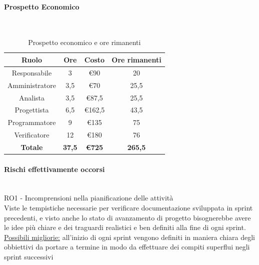 \documentclass{article}
\begin{document}
                \paragraph{Prospetto Economico}\mbox{}\\
                \begin{table}[H]
                    \centering
                    \begin{tabular}{|c|c|c|c|}
                    \hline
                    \textbf{Ruolo}  & \textbf{Ore}  & \textbf{Costo} & \textbf{Ore rimanenti} \\ \hline
                    Responsabile    & 3             & €90            & 20                     \\ \hline
                    Amministratore  & 3,5           & €70            & 25,5                     \\ \hline
                    Analista        & 3,5           & €87,5          & 25,5                     \\ \hline
                    Progettista     & 6,5           & €162,5         & 43,5                     \\ \hline
                    Programmatore   & 9            & €135           & 75                     \\ \hline
                    Verificatore    & 12            & €180           & 76                     \\ \hline
                    \textbf{Totale} & \textbf{37,5} & \textbf{\euro725}   & \textbf{265,5}           \\ \hline
                    \end{tabular}
                    \caption{Prospetto economico e ore rimanenti}
                \end{table}


                \paragraph{Rischi effettivamente occorsi}\mbox{}\\
                RO1 - Incomprensioni nella pianificazione delle attività \\
                Viste le tempistiche necessarie per verificare documentazione sviluppata in sprint precedenti, e visto anche lo stato di avanzamento di progetto bisognerebbe avere le idee più chiare e dei traguardi realistici e ben definiti alla fine di ogni sprint. \\
                \underline{Possibili migliorie:} all’inizio di ogni sprint vengono definiti in maniera chiara degli obbiettivi da portare a termine in modo da effettuare dei compiti superflui negli sprint successivi
\end{document}
